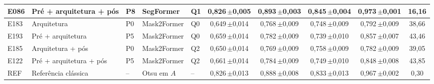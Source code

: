 \begin{table}[htbp]
\begin{sbcfitwidth}
\begin{tabular}{lllllccccc}
E086 & Pré + arquitetura + pós & P8 & SegFormer & Q1 & 0{,}826\,{\scriptsize$\pm$0{,}005} & 0{,}893\,{\scriptsize$\pm$0{,}003} & 0{,}845\,{\scriptsize$\pm$0{,}004} & 0{,}973\,{\scriptsize$\pm$0{,}001} & 16{,}16 \\
\midrule
E183 & Arquitetura & P0 & Mask2Former & Q0 & 0{,}649\,{\scriptsize$\pm$0{,}014} & 0{,}768\,{\scriptsize$\pm$0{,}009} & 0{,}748\,{\scriptsize$\pm$0{,}009} & 0{,}792\,{\scriptsize$\pm$0{,}009} & 38{,}66 \\
E193 & Pré + arquitetura & P5 & Mask2Former & Q0 & 0{,}659\,{\scriptsize$\pm$0{,}014} & 0{,}782\,{\scriptsize$\pm$0{,}009} & 0{,}739\,{\scriptsize$\pm$0{,}010} & 0{,}857\,{\scriptsize$\pm$0{,}007} & 43{,}46 \\
E185 & Arquitetura + pós & P0 & Mask2Former & Q2 & 0{,}650\,{\scriptsize$\pm$0{,}014} & 0{,}769\,{\scriptsize$\pm$0{,}009} & 0{,}758\,{\scriptsize$\pm$0{,}009} & 0{,}782\,{\scriptsize$\pm$0{,}009} & 39{,}05 \\
E122 & Pré + arquitetura + pós & P5 & Mask2Former & Q2 & 0{,}661\,{\scriptsize$\pm$0{,}014} & 0{,}784\,{\scriptsize$\pm$0{,}009} & 0{,}749\,{\scriptsize$\pm$0{,}010} & 0{,}848\,{\scriptsize$\pm$0{,}008} & 43{,}85 \\
\midrule
REF & Referência clássica & -- & Otsu em $A$ & -- & 0{,}826\,{\scriptsize$\pm$0{,}013} & 0{,}888\,{\scriptsize$\pm$0{,}008} & 0{,}833\,{\scriptsize$\pm$0{,}013} & 0{,}967\,{\scriptsize$\pm$0{,}002} & 0{,}30 \\
\bottomrule
\end{tabular}
\end{sbcfitwidth}
\end{table}
